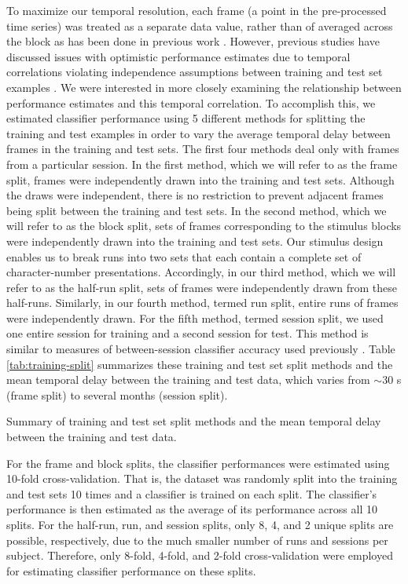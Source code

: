 \documentclass[preprint,authoryear,12pt]{elsarticle}
\begin{document}
To maximize our temporal resolution, each frame (a point in the pre-processed time series) was treated as a separate data value, rather than of averaged across the block as has been done in previous work \citep{BlockAveraging}.
However, previous studies have discussed issues with optimistic performance estimates due to temporal correlations violating independence assumptions between training and test set examples \citep{Pereira2009}.
We were interested in more closely examining the relationship between performance estimates and this temporal correlation.
To accomplish this, we estimated classifier performance using 5 different methods for splitting the training and test examples in order to vary the average temporal delay between frames in the training and test sets. 
The first four methods deal only with frames from a particular session.
In the first method, which we will refer to as the frame split, frames were independently drawn into the training and test sets. 
Although the draws were independent, there is no restriction to prevent adjacent frames being split between the training and test sets.
In the second method, which we will refer to as the block split, sets of frames corresponding to the stimulus blocks were independently drawn into the training and test sets.
Our stimulus design enables us to break runs into two sets that each contain a complete set of character-number presentations. 
Accordingly, in our third method, which we will refer to as the half-run split, sets of frames were independently drawn from these half-runs. 
Similarly, in our fourth method, termed run split, entire runs of frames were independently drawn. 
For the fifth method, termed session split, we used one entire session for training and a second session for test.
This method is similar to measures of between-session classifier accuracy used previously \citep{BetweenSessionAccuracy}.
Table \ref{tab:training-split} summarizes these training and test set split methods and the mean temporal delay between the training and test data, which varies from $\sim$30 s (frame split) to several months (session split).

\begin{table}
\centering

\caption{Summary of training and test set split methods and the mean temporal delay between the training and test data.}
\label{tab:training-split}
\end{table}

For the frame and block splits, the classifier performances were estimated using 10-fold cross-validation.
That is, the dataset was randomly split into the training and test sets 10 times and a classifier is trained on each split.
The classifier's performance is then estimated as the average of its performance across all 10 splits.
For the half-run, run, and session splits, only 8, 4, and 2 unique splits are possible, respectively, due to the much smaller number of runs and sessions per subject. 
Therefore, only 8-fold, 4-fold, and 2-fold cross-validation were employed for estimating classifier performance on these splits.
\end{document}
